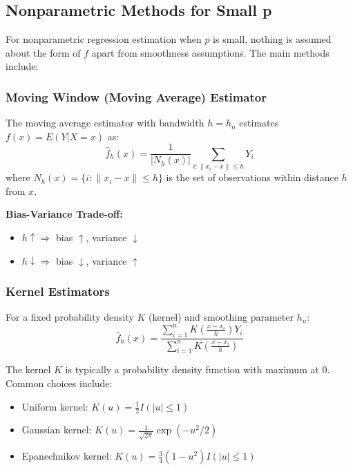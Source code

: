 \documentclass[12pt,a4paper]{article}
\begin{document}
\subsection{Nonparametric Methods for Small p}

For nonparametric regression estimation when $p$ is small, nothing is assumed about the form of $f$ apart from smoothness assumptions. The main methods include:

\subsubsection{Moving Window (Moving Average) Estimator}

The moving average estimator with bandwidth $h = h_n$ estimates $f(x) = E(Y|X = x)$ as:
\begin{equation}
\hat{f}_h(x) = \frac{1}{|N_h(x)|} \sum_{i: \|x_i - x\| \leq h} Y_i
\end{equation}
where $N_h(x) = \{i : \|x_i - x\| \leq h\}$ is the set of observations within distance $h$ from $x$.

\textbf{Bias-Variance Trade-off:}
\begin{itemize}
    \item $h \uparrow \Rightarrow$ bias $\uparrow$, variance $\downarrow$
    \item $h \downarrow \Rightarrow$ bias $\downarrow$, variance $\uparrow$
\end{itemize}

\subsubsection{Kernel Estimators}

For a fixed probability density $K$ (kernel) and smoothing parameter $h_n$:
\begin{equation}
\hat{f}_h(x) = \frac{\sum_{i=1}^n K\left(\frac{x - x_i}{h}\right) Y_i}{\sum_{i=1}^n K\left(\frac{x - x_i}{h}\right)}
\end{equation}

The kernel $K$ is typically a probability density function with maximum at 0. Common choices include:
\begin{itemize}
    \item Uniform kernel: $K(u) = \frac{1}{2}I(|u| \leq 1)$
    \item Gaussian kernel: $K(u) = \frac{1}{\sqrt{2\pi}}\exp(-u^2/2)$
    \item Epanechnikov kernel: $K(u) = \frac{3}{4}(1-u^2)I(|u| \leq 1)$
\end{itemize}
\end{document}
